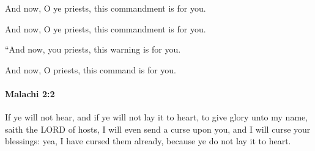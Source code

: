			And now, O ye priests, this commandment is for you.

			\begin{versebox}
					\item[BHS] 
					\item[LXX] 
					\item[ASV] And now, O ye priests, this commandment is for you.
					\item[NIV] “And now, you priests, this warning is for you.
					\item[NRSV] And now, O priests, this command is for you.
			\end{versebox}

		\paragraph{Malachi 2:2} %
			\label{MALACHI-2-2}

			If ye will not hear, and if ye will not lay it to heart, to give glory unto my name, saith the LORD of hosts, I will even send a curse upon you, and I will curse your blessings: yea, I have cursed them already, because ye do not lay it to heart.


